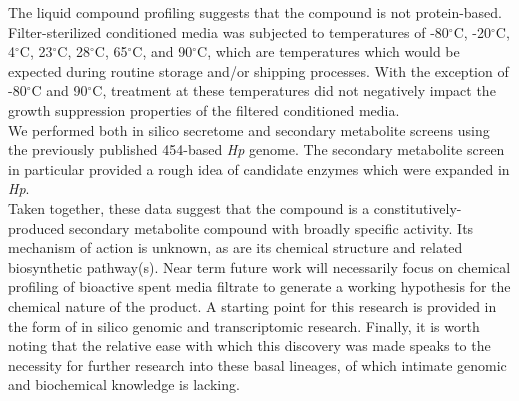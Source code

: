 \indent The liquid compound profiling suggests that the compound is not protein-based. Filter-sterilized conditioned media was subjected to temperatures of -80$^{\circ}$C, -20$^{\circ}$C, 4$^{\circ}$C, 23$^{\circ}$C, 28$^{\circ}$C, 65$^{\circ}$C, and 90$^{\circ}$C, which are temperatures which would be expected during routine storage and/or shipping processes. With the exception of -80$^{\circ}$C and 90$^{\circ}$C, treatment at these temperatures did not negatively impact the growth suppression properties of the filtered conditioned media.\\
\indent We performed both in silico secretome and secondary metabolite screens using the previously published 454-based \textit{Hp} genome. The secondary metabolite screen in particular provided a rough idea of candidate enzymes which were expanded in \textit{Hp}.\\
\indent Taken together, these data suggest that the compound is a constitutively-produced secondary metabolite compound with broadly specific activity. Its mechanism of action is unknown, as are its chemical structure and related biosynthetic pathway(s). Near term future work will necessarily focus on chemical profiling of bioactive spent media filtrate to generate a working hypothesis for the chemical nature of the product. A starting point for this research is provided in the form of in silico genomic and transcriptomic research. Finally, it is worth noting that the relative ease with which this discovery was made speaks to the necessity for further research into these basal lineages, of which intimate genomic and biochemical knowledge is lacking.
